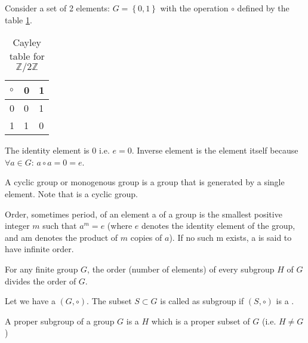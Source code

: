 \begin{appendices}
\begin{example}
  Consider a set of 2 elements: $G = \left\{0, 1\right\}$ with the
  operation $\circ$ defined by the table \ref{tab:CayleyZ2Z}.
  \begin{table}
    \centering
    \caption{Cayley table for $\mathbb{Z}/2\mathbb{Z}$}
    \label{tab:CayleyZ2Z}
    \begin{tabular}{l|ll}
      \toprule
      $\circ$ & 0 & 1 \\
      \midrule
      0 & 0 & 1 \\
      1 & 1 & 0 \\
      \bottomrule
    \end{tabular}
  \end{table}

  The identity element is $0$ i.e. $e = 0$.
  Inverse element is the element itself
  because $\forall a \in G$: $a \circ a = 0 = e$.
  \label{ex:group}
\end{example}

\begin{definition}
  A cyclic group or monogenous group is a group that is generated by a
  single element.
  Note that  is a cyclic group.
  \label{def:cyclicgroup}
\end{definition}

\begin{definition}
  Order, sometimes period, of an element a of a group is the smallest
  positive integer $m$ such that $a^m = e$ (where $e$ denotes the identity
  element of the group, and am denotes the product of $m$ copies of
  $a$). If no such m exists, a is said to have infinite order.
  \label{def:grouporder}
\end{definition}

\begin{theorem}[Lagrange]
  For any finite group $G$, the order (number of elements) of every
  subgroup $H$ of $G$ divides the order of $G$. 
  \label{thm:lagrange}
\end{theorem}


\begin{definition}[Subgroup]
  Let we have a  $\left(G, \circ\right)$. The
  subset $S \subset G$ is called as subgroup if $\left(S,
  \circ\right)$ is a .
  \label{def:subgroup}
\end{definition}

\begin{definition}
  A proper subgroup of a group $G$ is a  $H$
  which is a proper subset of $G$ (i.e. $H \ne G$) \cite{wiki:group}
  \label{def:propersubgroup}
\end{definition}


\end{appendices}
